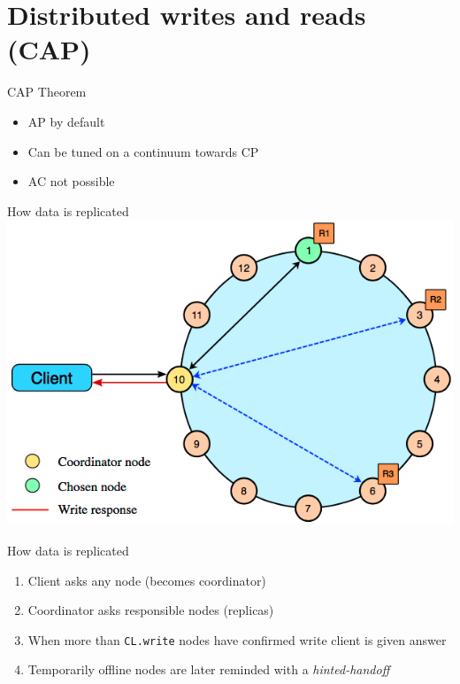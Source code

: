 \documentclass[
  10pt
]{beamer}
\begin{document}
\section{Distributed writes and reads (CAP)}  %

\begin{frame}{CAP Theorem}
  \begin{itemize}
    \item AP by default
    \item Can be tuned on a continuum towards CP
    \item AC not possible  %
  \end{itemize}
\end{frame}

\begin{frame}{How data is replicated \cite{cassandra_distributed_write}}
  \includegraphics[width=1.0\textwidth]{resources/distributed_write.png}
\end{frame}

\begin{frame}{How data is replicated}
  \begin{enumerate}
    \item<1-> Client asks any node (becomes coordinator)
    \item<2-> Coordinator asks responsible nodes (replicas)
    \item<3-> When more than \lstinline{CL.write} nodes have confirmed write client is given answer
    \item<4-> Temporarily offline nodes are later reminded with a \textit{hinted-handoff}
  \end{enumerate}
\end{frame}
\end{document}
